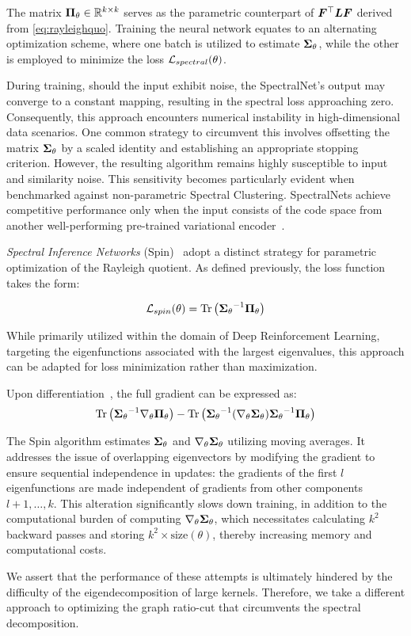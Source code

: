 The matrix ${\bm{\Pi}}_\theta \in {\mathbb{R}}^{k \times k}$ serves as the parametric counterpart
of ${\bm{F}}^\top {\bm{L}} {\bm{F}}$ derived from \cref{eq:rayleighquo}. Training the neural
network equates to an alternating optimization scheme, where one batch is utilized
to estimate ${\bm{\Sigma}}_\theta$, while the other is employed to minimize the loss
${\mathcal{L}}_{spectral}(\theta)$.

During training, should the input exhibit noise, the SpectralNet's output may
converge to a constant mapping, resulting in the spectral loss approaching zero.
Consequently, this approach encounters numerical instability in high-dimensional
data scenarios. One common strategy to circumvent this involves offsetting the
matrix ${\bm{\Sigma}}_\theta$ by a scaled identity and establishing an appropriate
stopping criterion. However, the resulting algorithm remains highly susceptible to
input and similarity noise. This sensitivity becomes particularly evident when
benchmarked against non-parametric Spectral Clustering. SpectralNets achieve
competitive performance only when the input consists of the code space from another
well-performing pre-trained variational encoder~\citep{vade}.

\textit{Spectral Inference Networks} (Spin)~\citep{spin} adopt a distinct strategy
for parametric optimization of the Rayleigh quotient. As defined previously, the
loss function takes the form:

\begin{align*}
	{\mathcal{L}}_{spin}(\theta) = \operatorname{Tr}\left({{\bm{\Sigma}}_\theta}^{-1}{\bm{\Pi}}_\theta\right)
\end{align*}

While primarily utilized within the domain of Deep Reinforcement Learning,
targeting the eigenfunctions associated with the largest eigenvalues, this approach
can be adapted for loss minimization rather than maximization.

Upon differentiation~\citep{matrixcook}, the full gradient can be expressed as:
\begin{align*}
	\operatorname{Tr}\left({{\bm{\Sigma}}_\theta}^{-1}\nabla_\theta{\bm{\Pi}}_\theta\right) -
	\operatorname{Tr}\left({{\bm{\Sigma}}_\theta}^{-1}(\nabla_\theta{{\bm{\Sigma}}_\theta}){{\bm{\Sigma}}_\theta}^{-1}{\bm{\Pi}}_\theta\right)
\end{align*}

The Spin algorithm estimates ${\bm{\Sigma}}_\theta$ and $\nabla_\theta {\bm{\Sigma}}_\theta$
utilizing moving averages. It addresses the issue of overlapping eigenvectors by
modifying the gradient to ensure sequential independence in updates: the gradients
of the first $l$ eigenfunctions are made independent of gradients from other
components ${l+1,\ldots, k}$. This alteration significantly slows down training, in
addition to the computational burden of computing $\nabla_\theta{\bm{\Sigma}}_\theta$,
which necessitates calculating $k^2$ backward passes and storing $k^2 \times
\text{size}(\theta)$, thereby increasing memory and computational costs.

We assert that the performance of these attempts is ultimately hindered by the
difficulty of the eigendecomposition of large kernels. Therefore, we take a
different approach to optimizing the graph ratio-cut that circumvents the spectral
decomposition.
